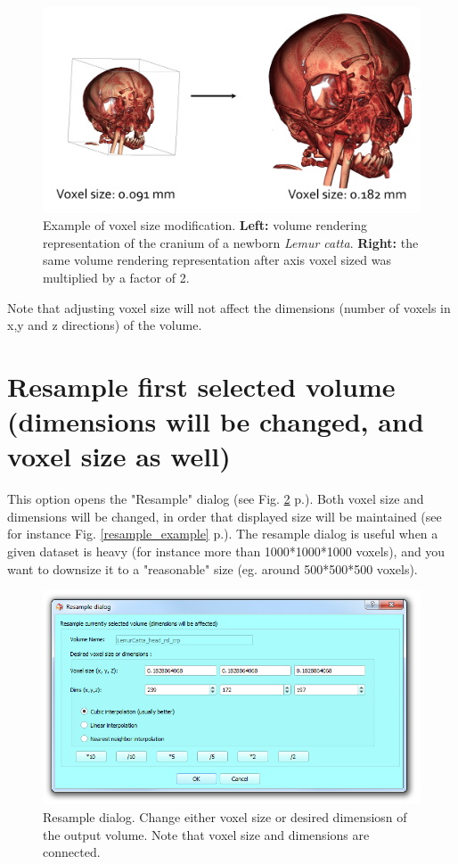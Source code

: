 \begin{figure}
  \centering
  \includegraphics[scale=0.35]{images/14/spacing/spacing_example.png}
\caption{ Example of voxel size modification. \textbf{Left:} volume rendering representation of the cranium of a newborn \textit{Lemur catta}. \textbf{Right:} the same volume rendering representation after axis voxel sized was multiplied by a factor of 2.}	
\label{spacing_example}
 \end{figure}
Note that adjusting voxel size will not affect the dimensions (number of voxels in x,y and z directions) of the volume.

\section{Resample first selected volume (dimensions will be changed, and voxel size as well)}

This option opens the "Resample" dialog (see Fig. \ref{resample_dialog} p.\pageref{resample_dialog}). Both voxel size and dimensions will be changed, in order that displayed size will be maintained (see for instance Fig. \ref{resample_example} p.\pageref{resample_example}). The resample dialog is useful when a given dataset is heavy (for instance more than 1000*1000*1000 voxels), and you want to downsize it to a "reasonable" size (eg. around 500*500*500 voxels).
 
\begin{figure}
  \centering
  \includegraphics[scale=0.5]{images/14/resample/resample_dialog.png}
\caption{Resample dialog. Change either voxel size or desired dimensiosn of the output volume. Note that voxel size and dimensions are connected.}	
\label{resample_dialog}
 \end{figure}


